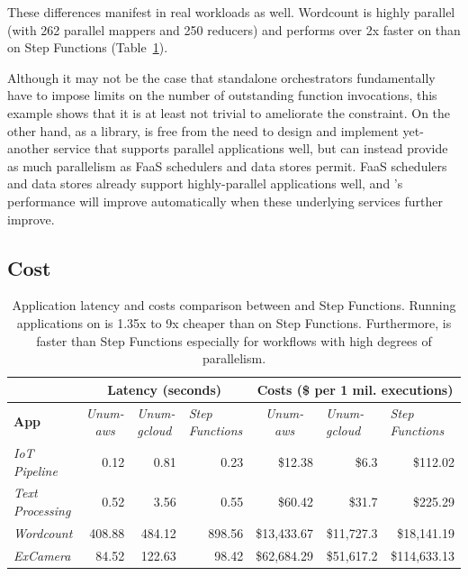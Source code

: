 These differences manifest in real workloads as well. Wordcount is highly
parallel (with 262 parallel mappers and 250 reducers) and performs over 2x
faster on \name{} than on Step Functions (Table~\ref{table:macro}).

Although it may not be the case that standalone orchestrators fundamentally
have to impose limits on the number of outstanding function invocations, this
example shows that it is at least not trivial to ameliorate the constraint. On
the other hand, as a library, \name{} is free from the need to design and
implement yet-another service that supports parallel applications well, but
can instead provide as much parallelism as FaaS schedulers and data stores
permit. FaaS schedulers and data stores already support highly-parallel
applications well, and \name{}’s performance will improve automatically when
these underlying services further improve.

\subsection{Cost}

\begin{table}[t]
  \centering
  \begin{tabular}{|l|rrr|rrr|}
\hline
                         & \multicolumn{3}{c|}{\textbf{Latency (seconds)}}                    & \multicolumn{3}{c|}{\textbf{Costs (\$ per 1 mil. executions)}} \\ \hline
\textbf{App} &
  \multicolumn{1}{c|}{\textit{Unum-aws}} &
  \multicolumn{1}{l|}{\textit{Unum-gcloud}} &
  \multicolumn{1}{l|}{\textit{Step Functions}} &
  \multicolumn{1}{c|}{\textit{Unum-aws}} &
  \multicolumn{1}{l|}{\textit{Unum-gcloud}} &
  \multicolumn{1}{l|}{\textit{Step Functions}} \\ \hline
\textit{IoT Pipeline}    & \multicolumn{1}{r|}{0.12}   & \multicolumn{1}{r|}{0.81}   & 0.23   & \multicolumn{1}{r|}{\$12.38}             & \multicolumn{1}{r|}{\$6.3}         & \$112.02            \\ \hline
\textit{Text Processing} & \multicolumn{1}{r|}{0.52}   & \multicolumn{1}{r|}{3.56}   & 0.55   & \multicolumn{1}{r|}{\$60.42}             & \multicolumn{1}{r|}{\$31.7}        & \$225.29            \\ \hline
\textit{Wordcount}       & \multicolumn{1}{r|}{408.88} & \multicolumn{1}{r|}{484.12} & 898.56 & \multicolumn{1}{r|}{\$13,433.67}         & \multicolumn{1}{r|}{\$11,727.3}    & \$18,141.19         \\ \hline
\textit{ExCamera}        & \multicolumn{1}{r|}{84.52}  & \multicolumn{1}{r|}{122.63} & 98.42  & \multicolumn{1}{r|}{\$62,684.29}         & \multicolumn{1}{r|}{\$51,617.2}    & \$114,633.13        \\ \hline
\end{tabular}
  \caption{Application latency and costs comparison between \name{} and Step
    Functions. Running applications on \name{} is 1.35x to 9x cheaper than
    on Step Functions. Furthermore, \name{} is faster than Step Functions
    especially for workflows with high degrees of parallelism.}
  \label{table:macro}
\end{table}


